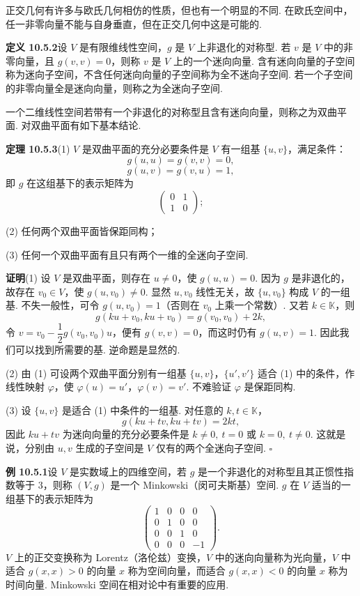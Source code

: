 \documentclass[UTF8, 12pt, fontset=fandol, oneside]{ctexart}
\begin{document}
正交几何有许多与欧氏几何相仿的性质，但也有一个明显的不同. 在欧氏空间中，任一非零向量不能与自身垂直，但在正交几何中这是可能的.

\noindent\textbf{定义 10.5.2}\quad 设 $V$ 是有限维线性空间，$g$ 是 $V$ 上非退化的对称型. 若 $v$ 是 $V$ 中的非零向量，且 $g(v,v)=0$，则称 $v$ 是 $V$ 上的一个迷向向量. 含有迷向向量的子空间称为迷向子空间，不含任何迷向向量的子空间称为全不迷向子空间. 若一个子空间的非零向量全是迷向向量，则称之为全迷向子空间.

一个二维线性空间若带有一个非退化的对称型且含有迷向向量，则称之为双曲平面. 对双曲平面有如下基本结论.

\noindent\textbf{定理 10.5.3}\quad (1) $V$ 是双曲平面的充分必要条件是 $V$ 有一组基 $\{u,v\}$，满足条件：
\[
  g(u,u)=g(v,v)=0,
\]
\[
  g(u,v)=g(v,u)=1,
\]
即 $g$ 在这组基下的表示矩阵为
\[
  \left(\begin{array}{cc}
  0&1\\
  1&0
  \end{array}\right);
\]

(2) 任何两个双曲平面皆保距同构；

(3) 任何一个双曲平面有且只有两个一维的全迷向子空间.

\noindent\textbf{证明}\quad (1) 设 $V$ 是双曲平面，则存在 $u\ne0$，使 $g(u,u)=0$. 因为 $g$ 是非退化的，故存在 $v_0\in V$，使 $g(u,v_0)\ne0$. 显然 $u,v_0$ 线性无关，故 $\{u,v_0\}$ 构成 $V$ 的一组基. 不失一般性，可令 $g(u,v_0)=1$（否则在 $v_0$ 上乘一个常数）. 又若 $k\in\mathbb K$，则
\[
  g(ku+v_0,ku+v_0)=g(v_0,v_0)+2k,
\]
令 $v=v_0-\dfrac12g(v_0,v_0)u$，便有 $g(v,v)=0$，而这时仍有 $g(u,v)=1$. 因此我们可以找到所需要的基. 逆命题是显然的.

(2) 由 (1) 可设两个双曲平面分别有一组基 $\{u,v\}$，$\{u',v'\}$ 适合 (1) 中的条件，作线性映射 $\varphi$，使 $\varphi(u)=u'$，$\varphi(v)=v'$. 不难验证 $\varphi$ 是保距同构.

(3) 设 $\{u,v\}$ 是适合 (1) 中条件的一组基. 对任意的 $k,t\in\mathbb K$，
\[
  g(ku+tv,ku+tv)=2kt,
\]
因此 $ku+tv$ 为迷向向量的充分必要条件是 $k\ne0,\ t=0$ 或 $k=0,\ t\ne0$. 这就是说，分别由 $u,v$ 生成的子空间是 $V$ 仅有的两个全迷向子空间. $\square$

\noindent\textbf{例 10.5.1}\quad 设 $V$ 是实数域上的四维空间，若 $g$ 是一个非退化的对称型且其正惯性指数等于 3，则称 $(V,g)$ 是一个 Minkowski（闵可夫斯基）空间. $g$ 在 $V$ 适当的一组基下的表示矩阵为
\[
  \left(\begin{array}{rrrr}
  1&0&0&0\\
  0&1&0&0\\
  0&0&1&0\\
  0&0&0&-1
  \end{array}\right).
\]
$V$ 上的正交变换称为 Lorentz（洛伦兹）变换，$V$ 中的迷向向量称为光向量，$V$ 中适合 $g(x,x)>0$ 的向量 $x$ 称为空间向量，而适合 $g(x,x)<0$ 的向量 $x$ 称为时间向量. Minkowski 空间在相对论中有重要的应用.
\end{document}
